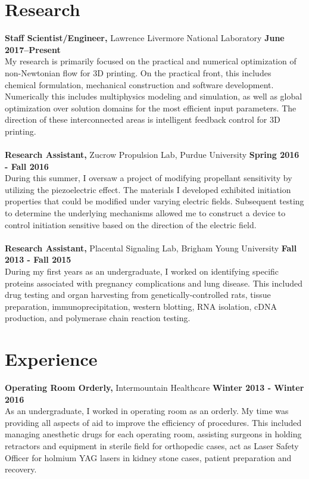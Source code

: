 \documentclass[margin,line]{res}
\begin{document}
\begin{resume}
\section{\sc Research}
{\bf Staff Scientist/Engineer,} Lawrence Livermore National Laboratory
\hfill {\bf June 2017--Present}\\
My research is primarily focused on the practical and numerical optimization of non-Newtonian flow for 3D printing. On the practical front, this includes  chemical formulation, mechanical construction and software development. Numerically this includes multiphysics modeling and simulation, as well as global optimization over solution domains for the most efficient input parameters. The direction of these interconnected areas is intelligent feedback control for 3D printing.\\
\\
{\bf Research Assistant,} Zucrow Propulsion Lab, Purdue University
\hfill {\bf Spring 2016 - Fall 2016}\\
During this summer, I oversaw a project of modifying propellant sensitivity by utilizing the piezoelectric effect. The materials I developed exhibited initiation properties that could be modified under varying electric fields. Subsequent testing to determine the underlying mechanisms allowed me to construct a device to control initiation sensitive based on the direction of the electric field.\\
\\
{\bf Research Assistant,} Placental Signaling Lab, Brigham Young University
\hfill {\bf Fall 2013 - Fall 2015}\\
During my first years as an undergraduate, I worked on identifying specific proteins associated with pregnancy complications and lung disease. This included drug testing and organ harvesting from genetically-controlled rats, tissue preparation, immunoprecipitation, western blotting, RNA isolation, cDNA production, and polymerase chain reaction testing. 

\section{\sc Experience}
{\bf Operating Room Orderly,} Intermountain Healthcare
\hfill {\bf Winter 2013 - Winter 2016}\\
As an undergraduate, I worked in operating room as an orderly. My time was providing all aspects of aid to improve the efficiency of procedures. This included managing anesthetic drugs for each operating room, assisting surgeons in holding retractors and equipment in sterile field for orthopedic cases, act as Laser Safety Officer for holmium YAG lasers in kidney stone cases, patient preparation and recovery.  \\


\end{resume}
\end{document}
